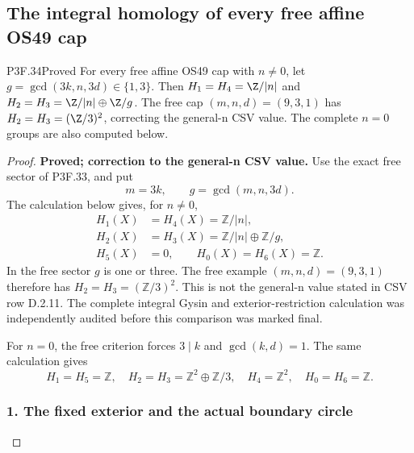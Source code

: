 \subsection{The integral homology of every free affine OS49 cap}
\begin{statement}{P3F.34}{Proved}
For every free affine OS49 cap with $n\ne0$, let $g=\gcd(3k,n,3d)\in\{1,3\}$. Then $H_1=H_4=\Z/|n|$ and $H_2=H_3=\Z/|n|\oplus\Z/g$. The free cap $(m,n,d)=(9,3,1)$ has $H_2=H_3=(\Z/3)^2$, correcting the general-n CSV value. The complete $n=0$ groups are also computed below.
\end{statement}
\begin{proof}
\textbf{Proved; correction to the general-n CSV value.} Use the exact free sector of P3F.33, and put \[
 m=3k,\qquad g=\gcd(m,n,3d).
\] The calculation below gives, for \(n\ne0\), \[
 \begin{aligned}
 H_1(X)&=H_4(X)=\mathbb Z/|n|,\\
 H_2(X)&=H_3(X)=\mathbb Z/|n|\oplus\mathbb Z/g,\\
 H_5(X)&=0,\qquad H_0(X)=H_6(X)=\mathbb Z.
 \end{aligned}                                      \tag{P3F.34.1}
\] In the free sector \(g\) is one or three. The free example \((m,n,d)=(9,3,1)\) therefore has \(H_2=H_3=(\mathbb Z/3)^2\). This is not the general-n value stated in CSV row D.2.11. The complete integral Gysin and exterior-restriction calculation was independently audited before this comparison was marked final.

For \(n=0\), the free criterion forces \(3\mid k\) and \(\gcd(k,d)=1\). The same calculation gives \[
 H_1=H_5=\mathbb Z,\quad
 H_2=H_3=\mathbb Z^2\oplus\mathbb Z/3,\quad
 H_4=\mathbb Z^2,\quad H_0=H_6=\mathbb Z.             \tag{P3F.34.2}
\]

\subsubsection{1. The fixed exterior and the actual boundary circle}\label{the-fixed-exterior-and-the-actual-boundary-circle}


\end{proof}
